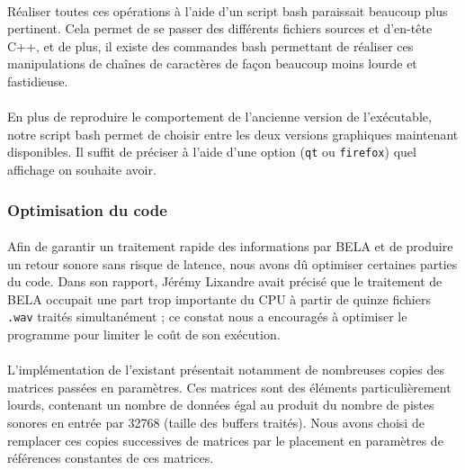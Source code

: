 \paragraph{}
Réaliser toutes ces opérations à l'aide d'un script bash paraissait beaucoup plus pertinent. Cela permet de se passer des différents fichiers sources et d'en-tête C++, et de plus, il existe des commandes bash permettant de réaliser ces manipulations de chaînes de caractères de façon beaucoup moins lourde et fastidieuse.
\paragraph{}
En plus de reproduire le comportement de l'ancienne version de l'exécutable, notre script bash permet de choisir entre les deux versions graphiques maintenant disponibles. Il suffit de préciser à l'aide d'une option (\verb!qt! ou \verb!firefox!) quel affichage on souhaite avoir.  
\subsubsection{Optimisation du code}
\paragraph{}
Afin de garantir un traitement rapide des informations par BELA et de
produire un retour sonore sans risque de latence, nous avons dû
optimiser certaines parties du code. Dans son rapport, Jérémy Lixandre
avait précisé que le traitement de BELA occupait une part trop
importante du CPU à partir de quinze fichiers \verb!.wav! traités
simultanément ; ce constat nous a encouragés à optimiser le programme
pour limiter le coût de son exécution.
\paragraph{}
L'implémentation de l'existant présentait notamment de nombreuses
copies des matrices passées en paramètres. Ces matrices sont des
éléments particulièrement lourds, contenant un nombre de données égal
au produit du nombre de pistes sonores en entrée par 32768 (taille des
buffers traités). Nous avons choisi de remplacer ces copies
successives de matrices par le placement en paramètres de références
constantes de ces matrices.

